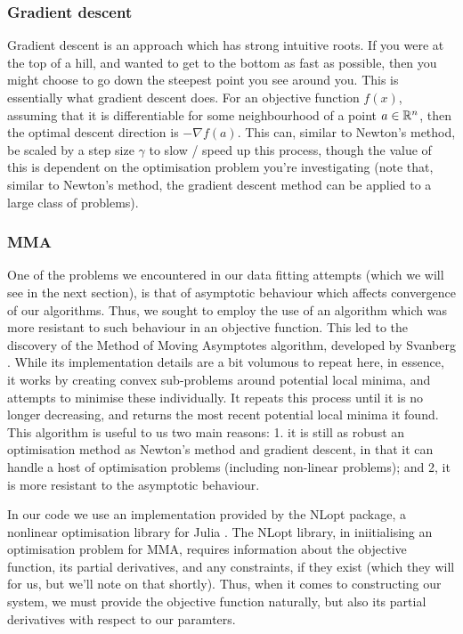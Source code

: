 \subsubsection{Gradient descent}
Gradient descent is an approach which has strong intuitive roots. If you were at the top of a hill, and wanted to get 
to the bottom as fast as possible, then you might choose to go down the steepest point you see around you. This is 
essentially what gradient descent does. For an objective function $f(x)$, assuming that it is differentiable 
for some neighbourhood of a point $a \in \mathbb{R}^n$, then the optimal descent direction is $- \nabla f(a)$. This can, 
similar to Newton's method, be scaled by a step size $\gamma$ to slow / speed up this process, though the value of 
this is dependent on the optimisation problem you're investigating (note that, similar to Newton's method, 
the gradient descent method can be applied to a large class of problems).

\subsubsection{MMA}
One of the problems we encountered in our data fitting attempts (which we will see in the next section), is that 
of asymptotic behaviour which affects convergence of our algorithms. Thus, we sought to employ the use of an algorithm 
which was more resistant to such behaviour in an objective function. This led to the discovery of the Method of Moving 
Asymptotes algorithm, developed 
by Svanberg \cite{mma}. While its implementation details are a bit volumous to repeat here, in essence, it works by creating 
convex sub-problems around potential local minima, and attempts to minimise these individually. It repeats this process until 
it is no longer decreasing, and returns the most recent potential local minima it found. This algorithm is 
useful to us two main reasons: 1. it is still as robust an optimisation method as Newton's method and gradient descent, in that it 
can handle a host of optimisation problems (including non-linear problems); and 2, it is more resistant to the asymptotic behaviour.

In our code we use an implementation provided by the NLopt package, a nonlinear optimisation library for Julia \cite{nlopt}. The NLopt
library, in iniitialising an optimisation problem for MMA, requires information about the objective function, its partial derivatives, 
and any constraints, if they exist (which they will for us, but we'll note on that shortly). Thus, when it comes to constructing 
our system, we must provide the objective function naturally, but also its partial derivatives with respect to our paramters.

